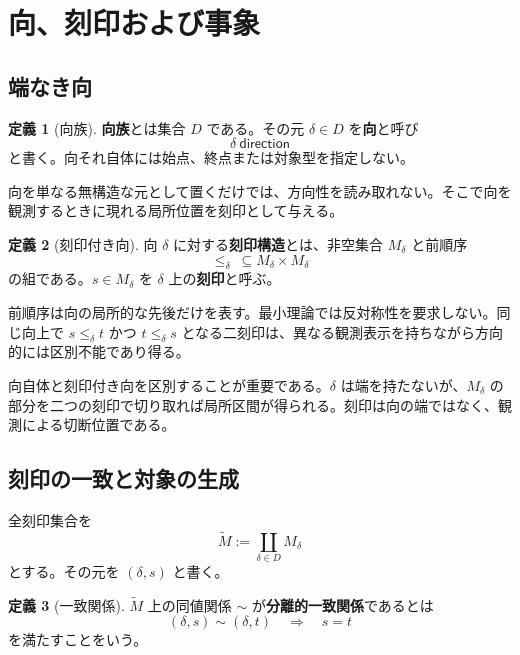 \documentclass[a4paper,11pt]{ltjsarticle}
\theoremstyle{definition}
\newtheorem{definition}{定義}[section]
\theoremstyle{plain}
\begin{document}
\section{向、刻印および事象}

\subsection{端なき向}

\begin{definition}[向族]
\textbf{向族}とは集合 $D$ である。その元 $\delta\in D$ を\textbf{向}と呼び
\[
 \delta\ \mathsf{direction}
\]
と書く。向それ自体には始点、終点または対象型を指定しない。
\end{definition}

向を単なる無構造な元として置くだけでは、方向性を読み取れない。そこで向を観測するときに現れる局所位置を刻印として与える。

\begin{definition}[刻印付き向]
向 $\delta$ に対する\textbf{刻印構造}とは、非空集合 $M_\delta$ と前順序
\[
 \leq_\delta\ \subseteq M_\delta\times M_\delta
\]
の組である。$s\in M_\delta$ を $\delta$ 上の\textbf{刻印}と呼ぶ。
\end{definition}

前順序は向の局所的な先後だけを表す。最小理論では反対称性を要求しない。同じ向上で $s\leq_\delta t$ かつ $t\leq_\delta s$ となる二刻印は、異なる観測表示を持ちながら方向的には区別不能であり得る。

向自体と刻印付き向を区別することが重要である。$\delta$ は端を持たないが、$M_\delta$ の部分を二つの刻印で切り取れば局所区間が得られる。刻印は向の端ではなく、観測による切断位置である。

\subsection{刻印の一致と対象の生成}

全刻印集合を
\[
 \widetilde M
 :=\coprod_{\delta\in D}M_\delta
\]
とする。その元を $(\delta,s)$ と書く。

\begin{definition}[一致関係]
$\widetilde M$ 上の同値関係 $\sim$ が\textbf{分離的一致関係}であるとは
\begin{equation}
 (\delta,s)\sim(\delta,t)
 \quad\Longrightarrow\quad
 s=t
 \label{eq:separated-coincidence}
\end{equation}
を満たすことをいう。
\end{definition}
\end{document}
